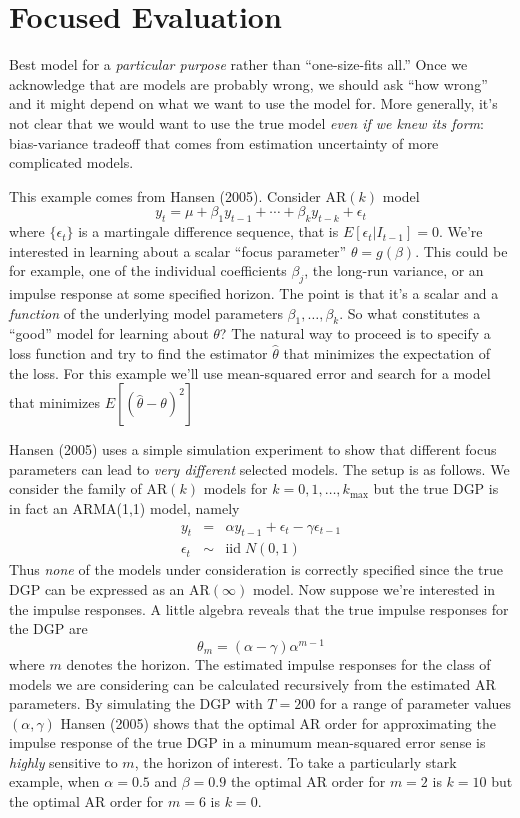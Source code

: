 \documentclass[12pt]{article}
\theoremstyle{definition}
\begin{document}
\section{Focused Evaluation}
Best model for a \emph{particular purpose} rather than ``one-size-fits all.'' Once we acknowledge that are models are probably wrong, we should ask ``how wrong'' and it might depend on what we want to use the model for. More generally, it's not clear that we would want to use the true model \emph{even if we knew its form}: bias-variance tradeoff that comes from estimation uncertainty of more complicated models.

This example comes from Hansen (2005). Consider AR$(k)$ model
	$$y_t = \mu + \beta_1 y_{t-1} + \cdots + \beta_k y_{t-k} + \epsilon_t$$
where $\{\epsilon_t\}$ is a martingale difference sequence, that is $E[\epsilon_t|I_{t-1}] = 0$. We're interested in learning about a scalar ``focus parameter'' $\theta = g(\beta)$. This could be for example, one of the individual coefficients $\beta_j$, the long-run variance, or an impulse response at some specified horizon. The point is that it's a scalar and a \emph{function} of the underlying model parameters $\beta_1, \hdots, \beta_k$. So what constitutes a ``good'' model for learning about $\theta$? The natural way to proceed is to specify a loss function and try to find the estimator $\widehat{\theta}$ that minimizes the expectation of the loss. For this example we'll use mean-squared error and search for a model that minimizes $E[(\widehat{\theta} - \theta)^2]$ 

Hansen (2005) uses a simple simulation experiment to show that different focus parameters can lead to \emph{very different} selected models. The setup is as follows. We consider the family of AR$(k)$ models for $k = 0, 1, \hdots, k_{\mbox{max}}$ but the true DGP is in fact an ARMA(1,1) model, namely
	\begin{eqnarray*}
		y_t &=& \alpha y_{t-1} + \epsilon_t - \gamma \epsilon_{t-1}\\
		\epsilon_t &\sim& \mbox{iid}\; N(0,1)
	\end{eqnarray*}
Thus \emph{none} of the models under consideration is correctly specified since the true DGP can be expressed as an AR$(\infty)$ model. Now suppose we're interested in the impulse responses. A little algebra reveals that the true impulse responses for the DGP are 
	$$\theta_m = (\alpha -\gamma)\alpha^{m-1}$$
where $m$ denotes the horizon. The estimated impulse responses for the class of models we are considering can be calculated recursively from the estimated AR parameters. By simulating the DGP with $T=200$ for a range of parameter values $(\alpha,\gamma)$ Hansen (2005) shows that the optimal AR order for approximating the impulse response of the true DGP in a minumum mean-squared error sense is \emph{highly} sensitive to $m$, the horizon of interest. To take a particularly stark example, when $\alpha = 0.5$ and $\beta = 0.9$ the optimal AR order for $m=2$ is $k=10$ but the optimal AR order for $m=6$ is $k=0$. 
\end{document}
